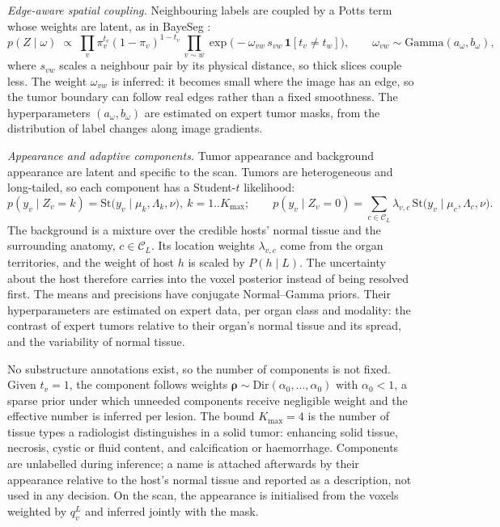 \documentclass[fleqn,10pt]{olplainarticle}
\begin{document}
\emph{Edge-aware spatial coupling.} Neighbouring labels are coupled by a Potts term whose weights are latent, as in
BayeSeg \cite{gao2023bayeseg}:
\begin{equation}
\label{eq:mrf}
p(Z\mid\omega)\;\propto\;\prod_{v}\pi_v^{t_v}(1-\pi_v)^{1-t_v}\,\prod_{v\sim w}\exp\bigl(-\omega_{vw}\,s_{vw}\,
\mathbf{1}[t_v\ne t_w]\bigr),\qquad \omega_{vw}\sim\mathrm{Gamma}(a_\omega,b_\omega),
\end{equation}
where $s_{vw}$ scales a neighbour pair by its physical distance, so thick slices couple less. The weight $\omega_{vw}$ is
inferred: it becomes small where the image has an edge, so the tumor boundary can follow real edges rather than a fixed
smoothness. The hyperparameters $(a_\omega,b_\omega)$ are estimated on expert tumor masks, from the distribution of label
changes along image gradients.

\emph{Appearance and adaptive components.} Tumor appearance and background appearance are latent and specific to the scan.
Tumors are heterogeneous and long-tailed, so each component has a Student-$t$ likelihood:
\begin{equation}
\label{eq:appearance}
p(y_v\mid Z_v=k)=\mathrm{St}\bigl(y_v\mid\mu_k,\Lambda_k,\nu\bigr),\ k=1..K_{\max};\qquad
p(y_v\mid Z_v=0)=\sum_{c\in\mathcal{C}_L}\lambda_{v,c}\,\mathrm{St}\bigl(y_v\mid\mu_c,\Lambda_c,\nu\bigr).
\end{equation}
The background is a mixture over the credible hosts' normal tissue and the surrounding anatomy, $c\in\mathcal{C}_L$. Its
location weights $\lambda_{v,c}$ come from the organ territories, and the weight of host $h$ is scaled by $P(h\mid L)$. The
uncertainty about the host therefore carries into the voxel posterior instead of being resolved first. The means and
precisions have conjugate Normal--Gamma priors. Their hyperparameters are estimated on expert data, per organ class and
modality: the contrast of expert tumors relative to their organ's normal tissue and its spread, and the variability of
normal tissue.

No substructure annotations exist, so the number of components is not fixed. Given $t_v=1$, the component follows weights
$\boldsymbol\rho\sim\mathrm{Dir}(\alpha_0,\dots,\alpha_0)$ with $\alpha_0<1$, a sparse prior under which unneeded components
receive negligible weight and the effective number is inferred per lesion. The bound $K_{\max}=4$ is the number of tissue
types a radiologist distinguishes in a solid tumor: enhancing solid tissue, necrosis, cystic or fluid content, and
calcification or haemorrhage. Components are unlabelled during inference; a name is attached afterwards by their appearance
relative to the host's normal tissue and reported as a description, not used in any decision. On the scan, the appearance is
initialised from the voxels weighted by $q^L_v$ and inferred jointly with the mask.
\end{document}
